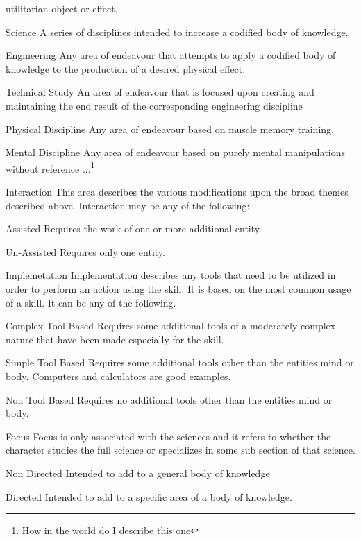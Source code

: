 \begin{relate}
\begin{relate}
		utilitarian object or effect.
		\item[Science]
		A series of disciplines intended to increase a codified body of
		knowledge.
		\item[Engineering]
		Any area of endeavour that attempts to apply a codified body of
		knowledge to the production of a desired physical effect.
		\item[Technical Study]
		An area of endeavour that is focused upon creating and maintaining the
		end result of the corresponding engineering discipline
		\item[Physical Discipline]
		Any area of endeavour based on muscle memory training.
		\item[Mental Discipline]
		Any area of endeavour based on purely mental manipulations without
		reference ...\footnote{How in the world do I describe this one}
		\end{relate}
		\item[Interaction]
		This area describes the various modifications upon the broad themes
		described above. Interaction may be any of the following:
		\begin{relate}
			\item[Assisted]
			Requires the work of one or more additional entity.
			\item[Un-Assisted]
			Requires only one entity.
		\end{relate}
	\item[Implemetation]
	Implementation describes any tools that need to be utilized in order
	to perform an action using the skill. It is based on the most common
	usage of a skill. It can be any of the following.
	\begin{relate}
		\item[Complex Tool Based]
		Requires some additional tools of a moderately complex nature that have been
		made especially for the skill.
		\item[Simple Tool Based]
		Requires some additional tools other than the entities mind or body.
		Computers and calculators are good examples.
		\item[Non Tool Based]
		Requires no additional tools other than the entities mind or body.
	\end{relate}
	\item[Focus]
	Focus is only associated with the sciences and it refers to whether
	the character studies the full science or specializes in some sub
	section of that science.
	\begin{relate}
		\item[Non Directed]
		Intended to add to a general body of knowledge
		\item[Directed]
		Intended to add to a specific area of a body of knowledge.
	\end{relate}
\end{relate}

